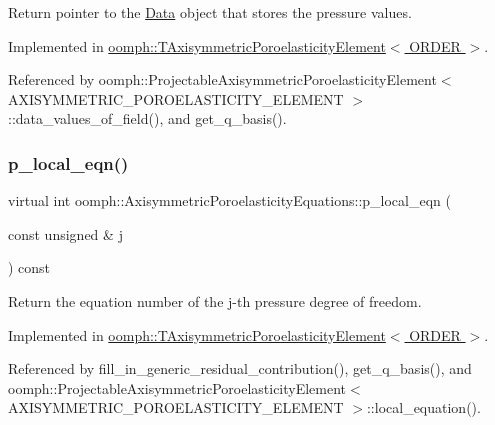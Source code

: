 Return pointer to the \hyperlink{classoomph_1_1Data}{Data} object that stores the pressure values. 



Implemented in \hyperlink{classoomph_1_1TAxisymmetricPoroelasticityElement_a8442be1bbcd76fddaa91fc674785e3ea}{oomph\+::\+T\+Axisymmetric\+Poroelasticity\+Element$<$ O\+R\+D\+E\+R $>$}.



Referenced by oomph\+::\+Projectable\+Axisymmetric\+Poroelasticity\+Element$<$ A\+X\+I\+S\+Y\+M\+M\+E\+T\+R\+I\+C\+\_\+\+P\+O\+R\+O\+E\+L\+A\+S\+T\+I\+C\+I\+T\+Y\+\_\+\+E\+L\+E\+M\+E\+N\+T $>$\+::data\+\_\+values\+\_\+of\+\_\+field(), and get\+\_\+q\+\_\+basis().

\mbox{\label{classoomph_1_1AxisymmetricPoroelasticityEquations_afb2d0c38f776d9182d2cf93b37206023}} 
\subsubsection{\texorpdfstring{p\+\_\+local\+\_\+eqn()}{p\_local\_eqn()}}
{\footnotesize\ttfamily virtual int oomph\+::\+Axisymmetric\+Poroelasticity\+Equations\+::p\+\_\+local\+\_\+eqn (\begin{DoxyParamCaption}\item[{const unsigned \&}]{j }\end{DoxyParamCaption}) const\hspace{0.3cm}{\ttfamily [pure virtual]}}



Return the equation number of the j-\/th pressure degree of freedom. 



Implemented in \hyperlink{classoomph_1_1TAxisymmetricPoroelasticityElement_aaa12fb476f9f78e519f5fa96b065a439}{oomph\+::\+T\+Axisymmetric\+Poroelasticity\+Element$<$ O\+R\+D\+E\+R $>$}.



Referenced by fill\+\_\+in\+\_\+generic\+\_\+residual\+\_\+contribution(), get\+\_\+q\+\_\+basis(), and oomph\+::\+Projectable\+Axisymmetric\+Poroelasticity\+Element$<$ A\+X\+I\+S\+Y\+M\+M\+E\+T\+R\+I\+C\+\_\+\+P\+O\+R\+O\+E\+L\+A\+S\+T\+I\+C\+I\+T\+Y\+\_\+\+E\+L\+E\+M\+E\+N\+T $>$\+::local\+\_\+equation().

